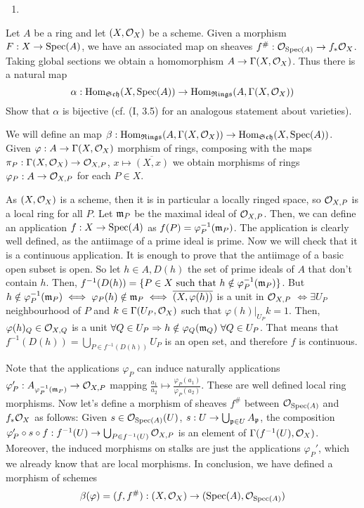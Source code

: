 \begin{sol}
\begin{enumerate}[label=\alph*)]
		\item 
	\end{enumerate}
\end{sol}

\begin{ex}
	Let $A$ be a ring and let $(X, \mathcal{O}_X)$ be a scheme. Given a morphism $F: X \to \mathrm{Spec}(A)$, we have an associated map on sheaves $f^{\#}: \mathcal{O}_{\mathrm{Spec}(A)} \to f_* \mathcal{O}_X$. Taking global sections we obtain a homomorphism $A \to \Gamma(X,\mathcal{O}_X)$. Thus there is a natural map
	\[
		\alpha: \mathrm{Hom}_{\mathfrak{Sch}}(X, \mathrm{Spec}(A)) \to \mathrm{Hom}_{\mathfrak{Rings}}(A,\Gamma(X, \mathcal{O}_X))
	\]
	Show that $\alpha$ is bijective (cf. (I, 3.5) for an analogous statement about varieties).
\end{ex}

\begin{sol}
	We will define an map $\beta: \mathrm{Hom}_{\mathfrak{Rings}}(A,\Gamma(X, \mathcal{O}_X)) \to \mathrm{Hom}_{\mathfrak{Sch}}(X, \mathrm{Spec}(A))$. Given $\varphi: A \to \Gamma(X, \mathcal{O}_X)$ morphism of rings, composing with the maps $\pi_P: \Gamma(X,\mathcal{O}_X) \to \mathcal{O}_{X,P}$, $x \mapsto \overline{(X,x)}$ we obtain morphisms of rings $\varphi_P: A \to \mathcal{O}_{X,P}$ for each $P \in X$.

	As $(X, \mathcal{O}_X)$ is a scheme, then it is in particular a locally ringed space, so $\mathcal{O}_{X,P}$ is a local ring for all $P$. Let $\mathfrak{m}_P$ be the maximal ideal of $\mathcal{O}_{X,P}$. Then, we can define an application $f: X \to \mathrm{Spec}(A)$ as $f(P) = \varphi_P^{-1}(\mathfrak{m}_P)$. The application is clearly well defined, as the antiimage of a prime ideal is prime. Now we will check that it is a continuous application. It is enough to prove that the antiimage of a basic open subset is open. So let $h \in A, D(h)$ the set of prime ideals of $A$ that don't contain $h$. Then, $f^{-1}(D(h)) = \{P \in X \text{ such that } h \notin \varphi_P^{-1}(\mathfrak{m}_P)\}$. But $h \notin \varphi_P^{-1}(\mathfrak{m}_P) \iff \varphi_P(h) \notin \mathfrak{m}_P \iff \overline{(X,\varphi(h))}$ is a unit in $\mathcal{O}_{X,P}$ $\iff \exists U_P$ neighbourhood of $P$ and $k \in \Gamma(U_P, \mathcal{O}_X)$ such that $\varphi(h)|_{U_P} k = 1$. Then, $\varphi(h)_Q \in \mathcal{O}_{X,Q}$ is a unit $\forall Q \in U_P \Rightarrow h \notin \varphi_Q(\mathfrak{m}_Q) \, \, \forall Q \in U_P$. That means that $f^{-1}(D(h)) = \bigcup_{P \in f^{-1}(D(h))} U_P$ is an open set, and therefore $f$ is continuous.

	Note that the applications $\varphi_P$ can induce naturally applications $\varphi'_P: A_{\varphi^{-1}_P(\mathfrak{m}_P)} \to \mathcal{O}_{X,P}$ mapping $\frac{a_1}{a_2} \mapsto \frac{\varphi_P(a_1)}{\varphi_P(a_2)}$. These are well defined local ring morphisms. Now let's define a morphism of sheaves $f^{\#}$ between $\mathcal{O}_{\mathrm{Spec}(A)}$ and $f_*\mathcal{O}_X$ as follows: Given $s \in \mathcal{O}_{\mathrm{Spec}(A)}(U)$, $s: U \to \bigcup_{\mathfrak{p} \in U} A_{\mathfrak{p}}$, the composition $\varphi_P' \circ s \circ f: f^{-1}(U) \to \bigcup_{P \in f^{-1}(U)} \mathcal{O}_{X,P}$ is an element of $\Gamma(f^{-1}(U),\mathcal{O}_X)$. Moreover, the induced morphisms on stalks are just the applications $\varphi_P'$, which we already know that are local morphisms. In conclusion, we have defined a morphism of schemes 
	\[
		\beta(\varphi) = (f, f^{\#}): (X,\mathcal{O}_X) \to (\mathrm{Spec}(A), \mathcal{O}_{\mathrm{Spec}(A)})
	\]


\end{sol}
